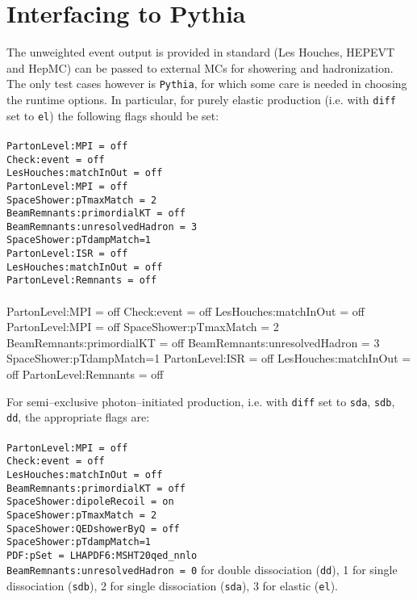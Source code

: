 \documentclass[12pt]{article}
\begin{document}
\section{Interfacing to Pythia}


The unweighted event output is provided in standard (Les Houches, HEPEVT and HepMC) can be passed to external MCs for showering and 
hadronization. The only test cases however is \texttt{Pythia}, for which some care is needed in choosing the runtime options. In particular, for purely elastic production (i.e. with \texttt{diff} set to \texttt{el}) the following flags should be set:
\\
\\
\texttt{PartonLevel:MPI = off}\\
\texttt{Check:event = off}\\
\texttt{LesHouches:matchInOut = off}\\
\texttt{PartonLevel:MPI = off}\\
\texttt{SpaceShower:pTmaxMatch = 2}\\
\texttt{BeamRemnants:primordialKT = off}\\
\texttt{BeamRemnants:unresolvedHadron = 3}\\
\texttt{SpaceShower:pTdampMatch=1}\\
\texttt{PartonLevel:ISR = off}\\
\texttt{LesHouches:matchInOut = off}\\
\texttt{PartonLevel:Remnants = off}\\
 \\
 PartonLevel:MPI = off
Check:event = off
LesHouches:matchInOut = off
PartonLevel:MPI = off
SpaceShower:pTmaxMatch = 2
BeamRemnants:primordialKT = off
BeamRemnants:unresolvedHadron = 3
SpaceShower:pTdampMatch=1
PartonLevel:ISR = off
LesHouches:matchInOut = off
PartonLevel:Remnants = off
 
 For semi--exclusive photon--initiated production, i.e. with \texttt{diff} set to 
 \texttt{sda}, \texttt{sdb}, \texttt{dd}, the appropriate flags are:
 \\
\\
\texttt{PartonLevel:MPI = off}\\
\texttt{Check:event = off}\\
\texttt{LesHouches:matchInOut = off}\\
\texttt{BeamRemnants:primordialKT = off}\\
\texttt{SpaceShower:dipoleRecoil = on} \\
\texttt{SpaceShower:pTmaxMatch = 2} \\
\texttt{SpaceShower:QEDshowerByQ = off} \\
\texttt{SpaceShower:pTdampMatch=1} \\
\texttt{PDF:pSet = LHAPDF6:MSHT20qed\_nnlo}\\
\texttt{BeamRemnants:unresolvedHadron = 0} for double dissociation (\texttt{dd}), 1 for single dissociation (\texttt{sdb}), 2 for single 
dissociation (\texttt{sda}), 3 for elastic (\texttt{el}). \\
\end{document}
